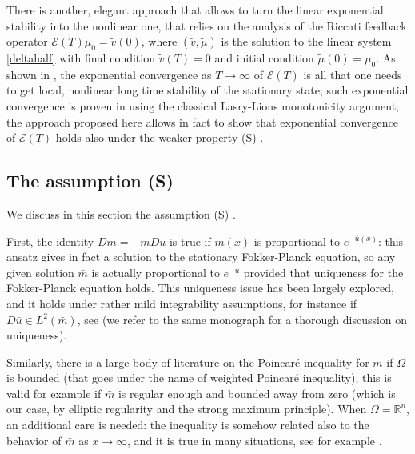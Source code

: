 \documentclass[10pt,a4paper,nouppercase,nowrite]{article}
\numberwithin{equation}{section}
\newcommand{\Sp}{{\textsc (S)} }
\newcommand{\eps}{\varepsilon}
\newcommand{\R}{\mathbb{R}}
\theoremstyle{definition}
\begin{document}
There is another, elegant approach that allows to turn the linear exponential stability into the nonlinear one, that relies on the analysis of the Riccati feedback operator $\mathcal E(T) \mu_0 = \tilde v (0)$, where $(\tilde v, \tilde \mu)$ is the solution to the linear system \eqref{deltahalf} with final condition $\tilde v(T) = 0$ and initial condition $\tilde \mu(0) = \mu_0$. As shown in \cite{PorrettaMinMax}, the exponential convergence as $T\to\infty$ of $\mathcal E(T)$ is all that one needs to get local, nonlinear long time stability of the stationary state; such exponential convergence is proven in \cite{PorrettaMinMax} using the classical Lasry-Lions monotonicity argument; the approach proposed here allows in fact to show that exponential convergence of $\mathcal E(T)$ holds also under the weaker property \Sp.

%	

\subsection{The assumption \Sp}

We discuss in this section the assumption \Sp. 

First, the identity $D\bar m = -\bar m D\bar u$ is true if $\bar m(x)$ is proportional to $e^{-\bar u(x)}$: this ansatz gives in fact a solution to the stationary Fokker-Planck equation, so any given solution $\bar m$ is actually proportional to $e^{-\bar u}$ provided that uniqueness for the Fokker-Planck equation holds. This uniqueness issue has been largely explored, and it holds under rather mild integrability assumptions, for instance if $D \bar u \in L^2(\bar m)$, see \cite[Example 5.5.4]{BKRS} (we refer to the same monograph for a thorough discussion on uniqueness).

Similarly, there is a large body of literature on the Poincar\'e inequality for $\bar m$ if $\Omega$ is bounded (that goes under the name of weighted Poincar\'e inequality); this is valid for example if $\bar m$ is regular enough and bounded away from zero (which is our case, by elliptic regularity and the strong maximum principle). When $\Omega = \R^n$, an additional care is needed: the inequality is somehow related also to the behavior of $\bar m$ as $x \to \infty$, and it is true in many situations, see for example \cite{bakry}. 
\end{document}

